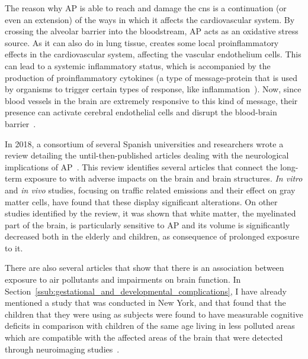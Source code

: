 The reason why \gls{AP} is able to reach and damage the \gls{cns} is a
continuation (or even an extension) of the ways in which it affects the
cardiovascular system. By crossing the alveolar barrier into the
bloodstream, \gls{AP} acts as an oxidative stress source. As it can also
do in lung tissue,  creates some local proinflammatory
effects in the cardiovascular system, affecting the vascular endothelium
cells. This can lead to a systemic inflammatory status, which is
accompanied by the production of proinflammatory cytokines (a type of
message-protein that is used by organisms to trigger certain types of
response, like inflammation~\cite{Zhang2007}). Now, since blood vessels in the
brain are extremely responsive to this kind of message, their presence
can activate cerebral endothelial cells and disrupt the blood-brain
barrier~\cite{Genc2012}.

In 2018, a consortium of several Spanish universities and researchers
wrote a review detailing the until-then-published articles dealing with
the neurological implications of \gls{AP}~\cite{DePradoBert2018}. This
review identifies several articles that connect the long-term exposure
to  with adverse impacts on the brain and brain structures.
\emph{In vitro} and \emph{in vivo} studies,  focusing on traffic related
emissions and their effect on gray matter cells, have found that these
display significant alterations. On other studies identified by the
review, it was shown that white matter, the myelinated part of the
brain, is particularly sensitive to \gls{AP} and its volume is
significantly decreased both in the elderly and children, as consequence
of prolonged exposure to it. 

There are also several articles that show that there is an association
between exposure to air pollutants and impairments on brain function.
In Section~\ref{ssub:gestational_and_developmental_complications},  I
have already mentioned a study that was conducted in New York, and that
found that the children that they were using as subjects were found to
have measurable cognitive deficits in comparison with children of the
same age living in less polluted areas which are compatible with the
affected areas of the brain that were detected through neuroimaging
studies~\cite{DePradoBert2018}.

